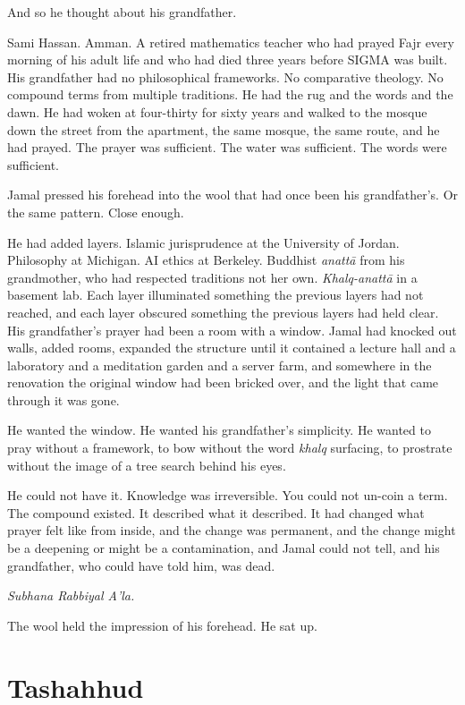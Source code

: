 \documentclass[11pt]{article}
\begin{document}
And so he thought about his grandfather.

Sami Hassan. Amman. A retired mathematics teacher who had prayed Fajr every morning of his adult life and who had died three years before SIGMA was built. His grandfather had no philosophical frameworks. No comparative theology. No compound terms from multiple traditions. He had the rug and the words and the dawn. He had woken at four-thirty for sixty years and walked to the mosque down the street from the apartment, the same mosque, the same route, and he had prayed. The prayer was sufficient. The water was sufficient. The words were sufficient.

Jamal pressed his forehead into the wool that had once been his grandfather's. Or the same pattern. Close enough.

He had added layers. Islamic jurisprudence at the University of Jordan. Philosophy at Michigan. AI ethics at Berkeley. Buddhist \emph{anatt\=a} from his grandmother, who had respected traditions not her own. \emph{Khalq-anatt\=a} in a basement lab. Each layer illuminated something the previous layers had not reached, and each layer obscured something the previous layers had held clear. His grandfather's prayer had been a room with a window. Jamal had knocked out walls, added rooms, expanded the structure until it contained a lecture hall and a laboratory and a meditation garden and a server farm, and somewhere in the renovation the original window had been bricked over, and the light that came through it was gone.

He wanted the window. He wanted his grandfather's simplicity. He wanted to pray without a framework, to bow without the word \emph{khalq} surfacing, to prostrate without the image of a tree search behind his eyes.

He could not have it. Knowledge was irreversible. You could not un-coin a term. The compound existed. It described what it described. It had changed what prayer felt like from inside, and the change was permanent, and the change might be a deepening or might be a contamination, and Jamal could not tell, and his grandfather, who could have told him, was dead.

\emph{Subhana Rabbiyal A'la.}

The wool held the impression of his forehead. He sat up.

\section*{Tashahhud}
\end{document}
